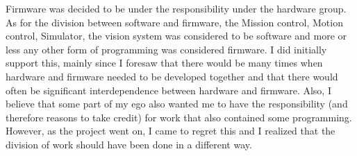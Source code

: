 Firmware was decided to be under the responsibility under the hardware group. As for the division between software and firmware, the Mission control, Motion control, Simulator, the vision system was considered to be software and more or less any other form of programming was considered firmware. \newline
I did initially support this, mainly since I foresaw that there would be many times when hardware and firmware needed to be developed together and that there would often be significant interdependence between hardware and firmware. Also, I believe that some part of my ego also wanted me to have the responsibility (and therefore reasons to take credit) for work that also contained some programming. \newline
However, as the project went on, I came to regret this and I realized that the division of work should have been done in a different way.

\newpage
